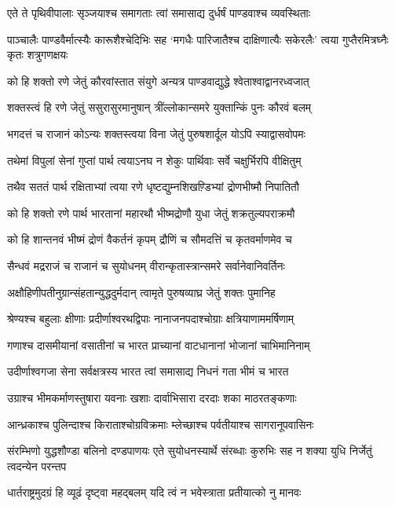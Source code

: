 \twolineshloka
{एते ते पृथिवीपालाः सृञ्जयाश्च समागताः}
{त्वां समासाद्य दुर्धर्षं पाण्डवाश्च व्यवस्थिताः}


\threelineshloka
{पाञ्चालैः पाण्डवैर्मात्स्यैः कारूशैश्चेदिभिः सह}
{`मगधैः पारिजातैश्च दाक्षिणात्यैः सकेरलैः'}
{त्वया गुप्तैरमित्रघ्नैः कृतः शत्रुगणक्षयः}


\twolineshloka
{को हि शक्तो रणे जेतुं कौरवांस्तात संयुगे}
{अन्यत्र पाण्डवाद्युद्धे श्वेताश्वाद्वानरध्वजात्}


\twolineshloka
{शक्तस्त्वं हि रणे जेतुं ससुरासुरमानुषान्}
{त्रींल्लोकान्समरे युक्तान्किं पुनः कौरवं बलम्}


\twolineshloka
{भगदत्तं च राजानं कोऽन्यः शक्तस्त्वया विना}
{जेतुं पुरुषशार्दूल योऽपि स्याद्वासवोपमः}


\twolineshloka
{तथेमां विपुलां सेनां गुप्तां पार्थ त्वयाऽनघ}
{न शेकुः पार्थिवाः सर्वे चक्षुर्भिरपि वीक्षितुम्}


\twolineshloka
{तथैव सततं पार्थ रक्षिताभ्यां त्वया रणे}
{धृष्टद्युम्नशिखण़्डिभ्यां द्रोणभीष्मौ निपातितौ}


\twolineshloka
{को हि शक्तो रणे पार्थ भारतानां महारथौ}
{भीष्मद्रोणौ युधा जेतुं शक्रतुल्यपराक्रमौ}


\twolineshloka
{को हि शान्तनवं भीष्मं द्रोणं वैकर्तनं कृपम्}
{द्रौणिं च सौमदत्तिं च कृतवर्माणमेव च}


\twolineshloka
{सैन्धवं मद्रराजं च राजानं च सुयोधनम्}
{वीरान्कृतास्त्रान्समरे सर्वानेवानिवर्तिनः}


\twolineshloka
{अक्षौहिणीपतीनुग्रान्संहतान्युद्धदुर्मदान्}
{त्वामृते पुरुषव्याघ्र जेतुं शक्तः पुमानिह}


\twolineshloka
{श्रेण्यश्च बहुलाः क्षीणाः प्रदीर्णाश्वरथद्विपाः}
{नानाजनपदाश्चोग्राः क्षत्रियाणाममर्षिणाम्}


\threelineshloka
{गणाश्च दासमीयानां वसातीनां च भारत}
{प्राच्यानां वाटधानानां भोजानां चाभिमानिनाम्}
{}


\twolineshloka
{उदीर्णाश्वगजा सेना सर्वक्षत्रस्य भारत}
{त्वां समासाद्य निधनं गता भीमं च भारत}


\twolineshloka
{उग्राश्च भीमकर्माणस्तुषारा यवनाः खशाः}
{दार्वाभिसारा दरदाः शका माठरतङ्कणाः}


\twolineshloka
{आन्ध्रकाश्च पुलिन्दाश्च किराताश्चोग्रविक्रमाः}
{म्लेच्छाश्च पर्वतीयाश्च सागरानूपवासिनः}


संरम्भिणो युद्धशौण्डा बलिनो दण्डपाणयः
\twolineshloka
{एते सुयोधनस्यार्थे संरब्धाः कुरुभिः सह}
{न शक्या युधि निर्जेतुं त्वदन्येन परन्तप}


\twolineshloka
{धार्तराष्ट्रमुदग्रं हि व्यूढं दृष्ट्वा महद्बलम्}
{यदि त्वं न भवेस्त्राता प्रतीयात्को नु मानवः}


